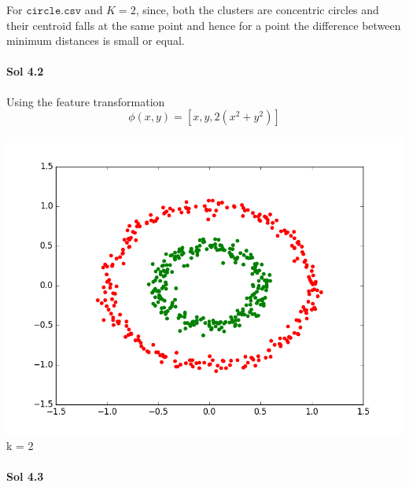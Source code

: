 \documentclass[]{report}
\begin{document}
	For $\texttt{circle.csv}$ and $K = 2$, since, both the clusters are concentric circles and their centroid falls at the same point and hence for a point the difference between minimum distances is small or equal.

\paragraph{Sol 4.2}
	Using the feature transformation
	\[ \phi(x, y) = [x, y, 2(x^2 + y^2)] \]
	
	\begin{center}
		\includegraphics[width=\textwidth]{Kernel-Kmeans-2}
		k = 2
	\end{center}

\paragraph{Sol 4.3}
\end{document}
